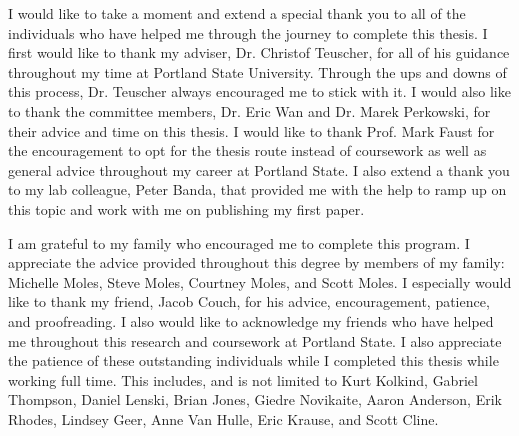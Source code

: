I would like to take a moment and extend a special thank you to all of the individuals who have helped me through the journey to complete this thesis. I first would like to thank my adviser, Dr. Christof Teuscher, for all of his guidance throughout my time at Portland State University. Through the ups and downs of this process, Dr. Teuscher always encouraged me to stick with it. I would also like to thank the committee members, Dr. Eric Wan and Dr. Marek Perkowski, for their advice and time on this thesis. I would like to thank Prof. Mark Faust for the encouragement to opt for the thesis route instead of coursework as well as general advice throughout my career at Portland State. I also extend a thank you to my lab colleague, Peter Banda, that provided me with the help to ramp up on this topic and work with me on publishing my first paper.

I am grateful to my family who encouraged me to complete this program. I appreciate the advice provided throughout this degree by members of my family: Michelle Moles, Steve Moles, Courtney Moles, and Scott Moles. I especially would like to thank my friend, Jacob Couch, for his advice, encouragement, patience, and proofreading. I also would like to acknowledge my friends who have helped me throughout this research and coursework at Portland State. I also appreciate the patience of these outstanding individuals while I completed this thesis while working full time. This includes, and is not limited to Kurt Kolkind, Gabriel Thompson, Daniel Lenski, Brian Jones, Giedre Novikaite, Aaron Anderson, Erik Rhodes, Lindsey Geer, Anne Van Hulle, Eric Krause, and Scott Cline.
